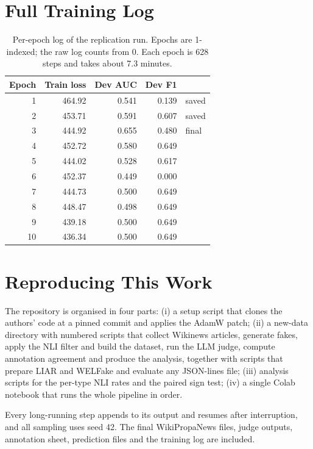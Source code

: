 \documentclass[11pt]{article}
\begin{document}
\section{Full Training Log}
\label{app:log}

\begin{table}[h]
\centering\small
\begin{tabular}{rrrrl}
\toprule
Epoch & Train loss & Dev AUC & Dev F1 & \\
\midrule
1 & 464.92 & 0.541 & 0.139 & saved \\
2 & 453.71 & 0.591 & 0.607 & saved \\
3 & 444.92 & 0.655 & 0.480 & final \\
4 & 452.72 & 0.580 & 0.649 & \\
5 & 444.02 & 0.528 & 0.617 & \\
6 & 452.37 & 0.449 & 0.000 & \\
7 & 444.73 & 0.500 & 0.649 & \\
8 & 448.47 & 0.498 & 0.649 & \\
9 & 439.18 & 0.500 & 0.649 & \\
10 & 436.34 & 0.500 & 0.649 & \\
\bottomrule
\end{tabular}
\caption{Per-epoch log of the replication run. Epochs are 1-indexed; the raw log counts from 0. Each epoch is 628 steps and takes about 7.3 minutes.}
\end{table}

\section{Reproducing This Work}
\label{app:repro}

The repository is organised in four parts:
(i) a setup script that clones the authors' code at a pinned commit and applies the AdamW patch;
(ii) a new-data directory with numbered scripts that collect Wikinews articles, generate fakes, apply the NLI filter and build the dataset, run the LLM judge, compute annotation agreement and produce the analysis, together with scripts that prepare LIAR and WELFake and evaluate any JSON-lines file;
(iii) analysis scripts for the per-type NLI rates and the paired sign test;
(iv) a single Colab notebook that runs the whole pipeline in order.

Every long-running step appends to its output and resumes after interruption, and all sampling uses seed 42. The final WikiPropaNews files, judge outputs, annotation sheet, prediction files and the training log are included.
\end{document}
